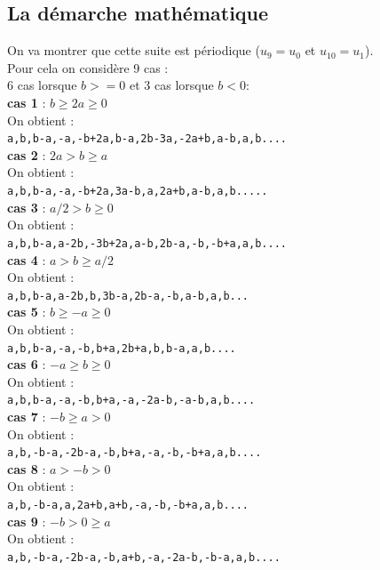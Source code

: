 \documentclass[a4paper,11pt]{book}
\begin{document}
\subsection{La d\'emarche math\'ematique}
On va montrer que cette suite est p\'eriodique ($u_9=u_0$ et $u_{10}=u_1$).\\
Pour cela on consid\`ere 9 cas :\\
6 cas lorsque $b>=0$ et 3 cas lorsque $b<0$:\\
{\bf cas 1} : $b \geq 2a \geq 0$\\
On obtient :\\
{\tt a,b,b-a,-a,-b+2a,b-a,2b-3a,-2a+b,a-b,a,b....}\\
{\bf cas 2} : $2a > b \geq a$\\
On obtient :\\
{\tt a,b,b-a,-a,-b+2a,3a-b,a,2a+b,a-b,a,b.....}\\
{\bf cas 3} : $a/2 >b \geq 0$\\
On obtient :\\
{\tt a,b,b-a,a-2b,-3b+2a,a-b,2b-a,-b,-b+a,a,b....}\\
{\bf cas 4} : $a>  b \geq a/2$\\
On obtient :\\
{\tt a,b,b-a,a-2b,b,3b-a,2b-a,-b,a-b,a,b...}\\
{\bf cas 5} : $b \geq -a \geq 0$\\
On obtient :\\
{\tt a,b,b-a,-a,-b,b+a,2b+a,b,b-a,a,b....}\\
{\bf cas 6} : $-a \geq b \geq 0$\\
On obtient :\\
{\tt a,b,b-a,-a,-b,b+a,-a,-2a-b,-a-b,a,b....}\\
{\bf cas 7} : $-b \geq a >0$\\
On obtient :\\
{\tt a,b,-b-a,-2b-a,-b,b+a,-a,-b,-b+a,a,b....}\\
{\bf cas 8} : $a >-b >0$\\
On obtient :\\
{\tt a,b,-b-a,a,2a+b,a+b,-a,-b,-b+a,a,b....}\\
{\bf cas 9} : $-b >0 \geq a $\\
On obtient :\\
{\tt a,b,-b-a,-2b-a,-b,a+b,-a,-2a-b,-b-a,a,b....}\\
\end{document}

